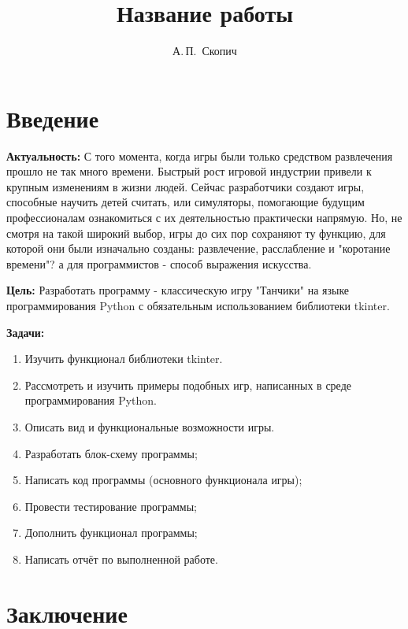 \documentclass[14pt, oneside]{altsu-report}
\title{Название работы}
\author{А.\,П.~Скопич}
\institute{Институт цифровых технологий, электроники и физики}
\date{\the\year}
\begin{document}
\maketitle

\setcounter{page}{2}
\makeabstract
\tableofcontents

\chapter*{Введение}

\textbf{Актуальность: }
С того момента, когда игры были только средством развлечения прошло не так много времени. Быстрый рост игровой индустрии привели к крупным изменениям в жизни людей. Сейчас разработчики создают игры, способные научить детей считать, или симуляторы, помогающие будущим профессионалам ознакомиться с их деятельностью практически напрямую. Но, не смотря на такой широкий выбор, игры до сих пор сохраняют ту функцию, для которой они были изначально созданы: развлечение, расслабление и "коротание времени"? а для программистов - способ выражения искусства.

\textbf{Цель: }
Разработать программу - классическую игру "Танчики" на языке программирования Python с обязательным использованием библиотеки tkinter.

\textbf{Задачи:}
\begin{enumerate}
\item Изучить функционал библиотеки tkinter.
\item Рассмотреть и изучить примеры подобных игр, написанных в среде программирования Python.
\item Описать вид и функциональные возможности игры.
\item Разработать блок-схему программы;
\item Написать код программы (основного функционала игры);
\item Провести тестирование программы;
\item Дополнить функционал программы;
\item Написать отчёт по выполненной работе.
\end{enumerate}




\chapter*{Заключение}
\end{document}
